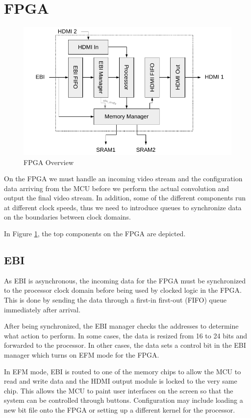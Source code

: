 \section{FPGA}
\begin{figure}
    \centering
    \includegraphics{img/FpgaOverview}
    \caption{FPGA Overview}
    \label{fig:FpgaOverview}
\end{figure}

On the FPGA we must handle an incoming video stream and the configuration data arriving from the MCU before we perform the actual convolution and output the final video stream. In addition, some of the different components run at different clock speeds, thus we need to introduce queues to synchronize data on the boundaries between clock domains.

In Figure \ref{fig:FpgaOverview}, the top components on the FPGA are depicted.

\subsection{EBI}
As EBI is asynchronous, the incoming data for the FPGA must be synchronized to the processor clock domain before being used by clocked logic in the FPGA.
This is done by sending the data through a first-in first-out (FIFO) queue immediately after arrival.

After being synchronized, the EBI manager checks the addresses to determine what action to perform. In some cases, the data is resized from 16 to 24 bits and forwarded to the processor. In other cases, the data sets a control bit in the EBI manager which turns on EFM mode for the FPGA.

In EFM mode, EBI is routed to one of the memory chips to allow the MCU to read and write data and the HDMI output module is locked to the very same chip.
This allows the MCU to paint user interfaces on the screen so that the system can be controlled through buttons.
Configuration may include loading a new bit file onto the FPGA or setting up a different kernel for the processor.

